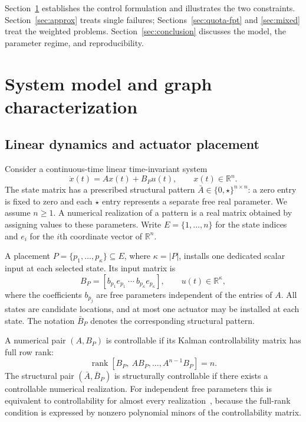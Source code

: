 \documentclass[11pt]{article}
\theoremstyle{definition}
\theoremstyle{remark}\newtheorem{remark}[theorem]{Remark}
\begin{document}
Section~\ref{sec:model} establishes the control formulation and
illustrates the two constraints. Section~\ref{sec:approx} treats
single failures; Sections~\ref{sec:quota-fpt} and
\ref{sec:mixed} treat the weighted problems. Section~\ref{sec:conclusion}
discusses the model, the parameter regime, and reproducibility.

\section{System model and graph characterization}\label{sec:model}
\subsection{Linear dynamics and actuator placement}
Consider a continuous-time linear time-invariant system
\begin{equation}\label{eq:dynamics}
 \dot{x}(t)=Ax(t)+B_Pu(t),\qquad x(t)\in\mathbb R^n.
\end{equation}
The state matrix has a prescribed structural pattern
$\bar A\in\{0,\star\}^{n\times n}$: a zero entry is fixed to
zero and each $\star$ entry represents a separate free real
parameter. We assume $n\ge1$. A numerical realization of a
pattern is a real matrix obtained by assigning values to these
parameters. Write $E=\{1,\ldots,n\}$ for the state indices and
$e_i$ for the $i$th coordinate vector of $\mathbb R^n$.

A placement $P=\{p_1,\ldots,p_\kappa\}\subseteq E$,
where $\kappa=|P|$, installs one dedicated scalar input at each selected state. Its
input matrix is
\begin{equation}\label{eq:dedicated}
 B_P=[b_{p_1}e_{p_1}\ \cdots\ b_{p_\kappa}e_{p_\kappa}],
 \qquad u(t)\in\mathbb R^\kappa,
\end{equation}
where the coefficients $b_{p_j}$ are free parameters independent
of the entries of $A$. All states are candidate locations,
and at most one actuator may be installed at each state.
The notation $\bar B_P$ denotes the corresponding structural
pattern.

A numerical pair $(A,B_P)$ is controllable if its Kalman
controllability matrix has full row rank:
\[
 \operatorname{rank}[B_P,\ AB_P,\ldots,A^{n-1}B_P]=n.
\]
The structural pair $(\bar A,\bar B_P)$ is structurally
controllable if there exists a controllable numerical
realization. For independent free parameters this is equivalent
to controllability for almost every realization~\cite{Lin,PKA},
because the full-rank condition is expressed by nonzero polynomial
minors of the controllability matrix.
\end{document}
